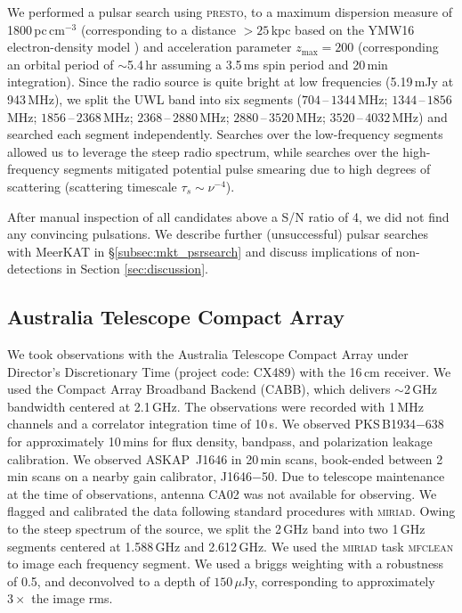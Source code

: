 \documentclass[fleqn,usenatbib]{mnras}
\newcommand{\blinky}{{4FGL}~J1646}
\newcommand{\blinkyaskap}{{ASKAP}~J1646}
\begin{document}
We performed a pulsar search using \textsc{presto}, to a maximum dispersion measure of 1800\,pc\,cm$^{-3}$ (corresponding to a distance $>25$\,kpc based on the YMW16 electron-density model \citep{2017ApJ...835...29Y}) and acceleration parameter $z_{\text{max}}=200$ (corresponding an orbital period of $\sim$5.4\,hr assuming a 3.5\,ms spin period and 20\,min integration). Since the radio source is quite bright at low frequencies (5.19\,mJy at 943\,MHz), we split the UWL band into six segments ($704$\,--\,$1344$\,MHz; $1344$\,--\,$1856$\,MHz; $1856$\,--\,$2368$\,MHz; $2368$\,--\,$2880$\,MHz; $2880$\,--\,$3520$\,MHz; $3520$\,--\,$4032$\,MHz) and searched each segment independently. Searches over the low-frequency segments allowed us to leverage the steep radio spectrum, while searches over the high-frequency segments mitigated potential pulse smearing due to high degrees of scattering (scattering timescale $\tau_s \sim \nu^{-4}$).

After manual inspection of all candidates above a S/N ratio of 4, we did not find any convincing pulsations. We describe further (unsuccessful) pulsar searches with MeerKAT in \S\ref{subsec:mkt_psrsearch} and discuss implications of non-detections in Section \ref{sec:discussion}.


\subsection{Australia Telescope Compact Array}
\label{subsec:ATCA_obs}
We took observations with the Australia Telescope Compact Array under Director's Discretionary Time (project code: CX489) with the 16\,cm receiver. We used the Compact Array Broadband Backend (CABB), which delivers $\sim$2\,GHz bandwidth centered at 2.1\,GHz. The observations were recorded with 1\,MHz channels and a correlator integration time of 10\,s. We observed PKS\,B1934$-$638 for approximately 10\,mins for flux density, bandpass, and polarization leakage calibration. We observed \blinkyaskap{} in 20\,min scans, book-ended between 2\,min scans on a nearby gain calibrator, J1646$-$50. Due to telescope maintenance at the time of observations, antenna CA02 was not available for observing. We flagged and calibrated the data following standard procedures with \textsc{miriad}. Owing to the steep spectrum of the source, we split the 2\,GHz band into two 1\,GHz segments centered at 1.588\,GHz and 2.612\,GHz. We used the \textsc{miriad} task \textsc{mfclean} to image each frequency segment. We used a briggs weighting with a robustness of 0.5, and deconvolved to a depth of $150$\,$\mu$Jy, corresponding to approximately $3\times$ the image rms. %
\end{document}
